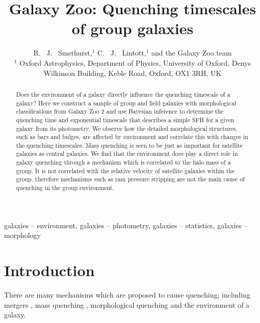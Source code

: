 \documentclass[useAMS,usenatbib]{mn2e}
\begin{document}
\title[Environmental quenching: yay or nay?]{Galaxy Zoo: Quenching timescales of group galaxies}
\author[Smethurst et al. 2015]{R. ~J. ~Smethurst,$^{1}$ C. ~J. ~Lintott,$^{1}$ and the Galaxy Zoo team \footnotemark[1]
\\ $^1$ Oxford Astrophysics, Department of Physics, University of Oxford, Denys Wilkinson Building, Keble Road, Oxford, OX1 3RH, UK 
}

\maketitle

\begin{abstract}
Does the environment of a galaxy directly influence the quenching timescale of a galaxy? Here we construct a sample of group and field galaxies with morphological classifications from Galaxy Zoo 2 and use Bayesian inference to determine the quenching time and exponential timescale that describes a simple SFH for a given galaxy from its photometry. We observe how the detailed morphological structures, such as bars and bulges, are affected by environment and correlate this with changes in the quenching timescales. Mass quenching is seen to be just as important for satellite galaxies as central galaxies.  We find that the environment does play a direct role in galaxy quenching through a mechanism which is correlated to the halo mass of a group. It is not correlated with the relative velocity of satellite galaxies within the group, therefore mechanisms such as ram pressure stripping are not the main cause of quenching in the group environment. 

\end{abstract}

\begin{keywords}
galaxies -- environment, galaxies -- photometry, galaxies -- statistics, galaxies -- morphology
\end{keywords}


\section{Introduction}\label{sec:intro}
 
 There are many mechanisms which are proposed to cause quenching; including mergers \citep{daddi10}, mass quenching \citep{kennicutt77, peng12}, morphological quenching \citep{faber12} and the environment of a galaxy.
 
\end{document}

